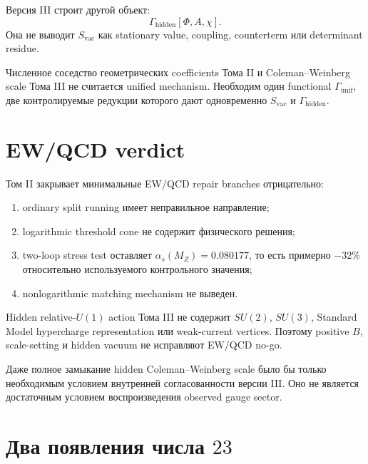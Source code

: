Версия III строит другой объект:
\begin{equation}
 \Gamma_{\mathrm{hidden}}[\Phi,A,\chi].
\end{equation}
Она не выводит \(S_{\mathrm{vac}}\) как stationary value, coupling,
counterterm или determinant residue.

\begin{nogocriterion}
Численное соседство геометрических coefficients Тома II и
Coleman--Weinberg scale Тома III не считается unified mechanism.
Необходим один functional \(\Gamma_{\mathrm{unif}}\), две контролируемые
редукции которого дают одновременно \(S_{\mathrm{vac}}\) и
\(\Gamma_{\mathrm{hidden}}\).
\end{nogocriterion}

\section{EW/QCD verdict}

Том II закрывает минимальные EW/QCD repair branches отрицательно:
\begin{enumerate}
 \item ordinary split running имеет неправильное направление;
 \item logarithmic threshold cone не содержит физического решения;
 \item two-loop stress test оставляет
 \(\alpha_s(M_Z)=0.080177\), то есть примерно \(-32\%\) относительно
 используемого контрольного значения;
 \item nonlogarithmic matching mechanism не выведен.
\end{enumerate}

Hidden relative-\(U(1)\) action Тома III не содержит
\(SU(2)\), \(SU(3)\), Standard Model hypercharge representation или
weak-current vertices. Поэтому positive \(B\), scale-setting и hidden
vacuum не исправляют EW/QCD no-go.

\begin{theorem}
Даже полное замыкание hidden Coleman--Weinberg scale было бы только
необходимым условием внутренней согласованности версии III. Оно не
является достаточным условием воспроизведения observed gauge sector.
\end{theorem}

\section{Два появления числа \(23\)}

